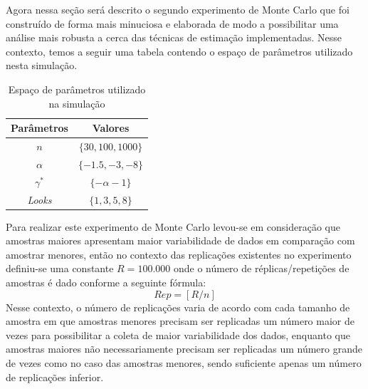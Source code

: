 \documentclass[12pt]{article}
\begin{document}
Agora nessa seção será descrito o segundo experimento de Monte Carlo que foi construído de forma mais minuciosa e elaborada de modo a possibilitar uma análise mais robusta a cerca das técnicas de estimação implementadas. Nesse contexto, temos a seguir uma tabela contendo o espaço de parâmetros utilizado nesta simulação.
\begin{table}[H]
\centering
\caption{Espaço de parâmetros utilizado na simulação}
\smallskip
{}
\label{tab:tabela_parameters_2}
\begin{tabular}{c|c}
\toprule 
\multicolumn{1}{c|}{Parâmetros} & \multicolumn{1}{c}{Valores}  \\ 
\midrule
\rowcolor[gray]{.9} 
$n$ & $\{30, 100, 1000\}$ \\ \hline
$\alpha$ & $\{-1.5, -3, -8\}$ \\ \hline
\rowcolor[gray]{.9} $\gamma^*$ & $\{-\alpha - 1\}$ \\ \hline
\textit{Looks} & $\{1, 3, 5, 8\}$ \\ 
\bottomrule
\end{tabular}
\end{table}

Para realizar este experimento de Monte Carlo levou-se em consideração que amostras maiores apresentam maior variabilidade de dados em comparação com amostrar menores, então no contexto das replicações existentes no experimento definiu-se uma constante $R = 100.000$ onde o número de réplicas/repetições de amostras é dado conforme a seguinte fórmula:
\begin{equation}
    Rep = [R/n] \label{eq:rep}
\end{equation}
Nesse contexto, o número de replicações varia de acordo com cada tamanho de amostra em que amostras menores precisam ser replicadas um número maior de vezes para possibilitar a coleta de maior variabilidade dos dados, enquanto que amostras maiores não necessariamente precisam ser replicadas um número grande de vezes como no caso das amostras menores, sendo suficiente apenas um número de replicações inferior. 
\end{document}
